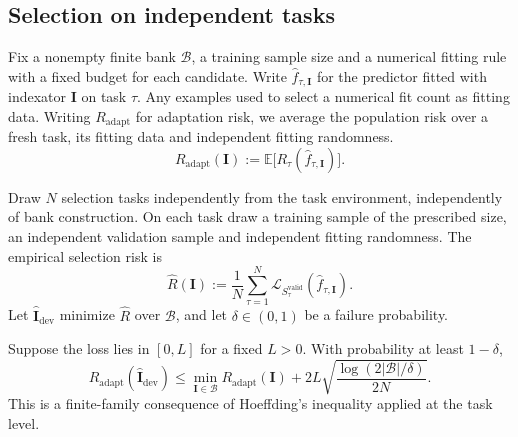 \subsection{Selection on independent tasks}
\label{app:theory-transfer}
\label{sec:theory-transfer}

Fix a nonempty finite bank $\mathcal B$, a training sample size
and a numerical fitting rule with a fixed budget for each candidate.
Write $\widehat f_{\tau,\mathbf I}$ for the predictor fitted with
indexator $\mathbf I$ on task $\tau$.
Any examples used to select a numerical fit count as fitting data.
Writing $R_{\mathrm{adapt}}$ for adaptation risk, we average the
population risk over a fresh task, its fitting data and independent
fitting randomness.
\begin{equation}
    R_{\mathrm{adapt}}(\mathbf I):=
        \mathbb E\bigl[R_\tau(\widehat f_{\tau,\mathbf I})\bigr].
    \label{eq:theory-adaptation-risk}
\end{equation}

Draw $N$ selection tasks independently from the task environment,
independently of bank construction. On each task draw a training
sample of the prescribed size, an independent validation sample
and independent fitting randomness. The empirical selection risk is
\begin{equation}
    \widehat R(\mathbf I):=\frac1N\sum_{\tau=1}^N
        \mathcal L_{S_\tau^{\mathrm{valid}}}(\widehat f_{\tau,\mathbf I}).
    \label{eq:theory-meta-selection}
\end{equation}
Let $\widehat{\mathbf I}_{\mathrm{dev}}$ minimize $\widehat R$
over $\mathcal B$, and let $\delta\in(0,1)$ be a failure probability.

\begin{theorem}
    \label{thm:theory-transfer}
    Suppose the loss lies in $[0,L]$ for a fixed $L>0$.
    With probability at least $1-\delta$,
    \begin{equation}
        R_{\mathrm{adapt}}
            (\widehat{\mathbf I}_{\mathrm{dev}})
        \le
        \min_{\mathbf I\in\mathcal B}
            R_{\mathrm{adapt}}(\mathbf I)
        +2L\sqrt{\frac{\log(2|\mathcal B|/\delta)}
                         {2N}}.
        \label{eq:theory-transfer-bound}
    \end{equation}
    This is a finite-family consequence of Hoeffding's inequality
    \cite{hoeffding1963probability} applied at the task level.
\end{theorem}

